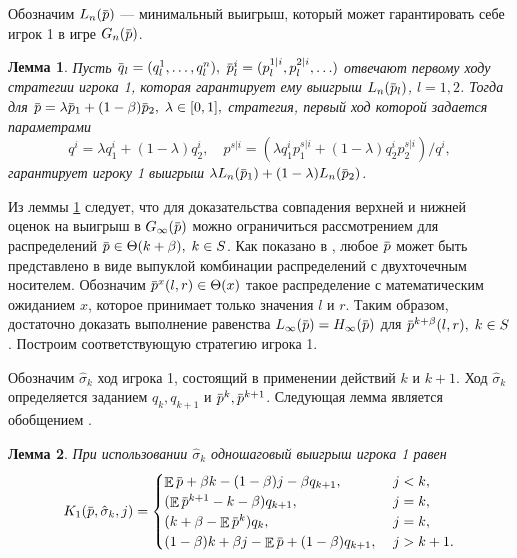 \documentclass[12pt, draft]{extarticle}
\newtheorem{lemma}{Лемма}
\newcommand{\overbar}[1]%
{\mkern 1.5mu\overline{\mkern-1.3mu#1\mkern-1.3mu}\mkern 1.3mu}
\newcommand{\p}{\ensuremath{\overbar{p}}}
\newcommand{\q}{\ensuremath{\overbar{q}}}
\DeclareMathOperator{\E}{\mathbb{E}}
\newcommand{\G}[1][n]{\ensuremath{G_{#1}}}
\newcommand{\K}[1][n]{\ensuremath{K_{#1}}}
\newcommand{\High}[1][\ensuremath{\infty}]{\ensuremath{H_{#1}}}
\newcommand{\sigmak}{\ensuremath{\hat{\sigma}}}
\newcommand{\Low}[1][\ensuremath{\infty}]{\ensuremath{L_{#1}}}
\begin{document}
Обозначим $\Low[n](\p)$ --- минимальный выигрыш, который может гарантировать
себе игрок 1 в игре $\G(\p)$.
\begin{lemma}
  \label{lower-bound:lemma:convex-combination}
  Пусть %
  $\q_l = (q^1_l, \ldots, q^n_l),$ %
  $\p^i_l = ( p^{1|i}_l, p^{2|i}_l, \ldots)$ %
  отвечают первому ходу стратегии игрока 1, которая гарантирует ему выигрыш
  $\Low[n](\p_l)$, $l = 1,2$. Тогда для $\p = \lambda \p_1 + (1-\beta) \p_2, \;
  \lambda \in [0, 1],$ стратегия, первый ход которой задается параметрами
  \begin{equation*}
    q^i = \lambda q^i_1 + (1-\lambda) q^i_2, \quad
    p^{s|i} = \left(\lambda q^i_1 p^{s|i}_1 + (1-\lambda) q^i_2 p^{s|i}_2\right)/q^i,
  \end{equation*}
  гарантирует игроку 1 выигрыш $\lambda \Low[n](\p_1) + (1-\lambda)
  \Low[n](\p_2)$.
\end{lemma}

Из леммы \ref{lower-bound:lemma:convex-combination} следует, что для
доказательства совпадения верхней и нижней оценок на выигрыш в $\G[\infty](\p)$
можно ограничиться рассмотрением для распределений $\p \in \Theta(k + \beta), \;
k \in S$. Как показано в \cite{bib:domansky11}, любое $\p$ может быть
представлено в виде выпуклой комбинации распределений с двухточечным носителем.
Обозначим $\p^x(l, r) \in \Theta(x)$ такое распределение с математическим
ожиданием $x$, которое принимает только значения $l$ и $r$. Таким образом,
достаточно доказать выполнение равенства $\Low(\p) = \High(\p)$ для
$\p^{k+\beta}(l,r), \; k \in S$. Построим соответствующую стратегию игрока 1.

Обозначим $\sigmak_k$ ход игрока 1, состоящий в применении действий $k$ и $k+1$.
Ход $\sigmak_k$ определяется заданием $q_k, q_{k+1}$ и $\p^k, \p^{k+1}$.
Следующая лемма является обобщением \cite[Утверждение 2]{bib:pyanykh16}.
\begin{lemma}
  \label{lower-bound:lemma:stage-payoff}
  При использовании $\sigmak_k$ одношаговый выигрыш игрока 1 равен
  \begin{equation*}
    \K[1](\p, \sigmak_k, j) = \begin{cases}
      \E \p + \beta k - (1-\beta) j - \beta q_{k+1}, &\; j < k, \\
      (\E \p^{k+1} - k - \beta) q_{k+1}, &\; j = k, \\
      (k + \beta - \E \p^k) q_k, &\; j = k, \\
      (1-\beta) k + \beta j - \E \p + (1-\beta) q_{k+1}, &\; j > k + 1.
    \end{cases}
  \end{equation*}
\end{lemma}
\end{document}
